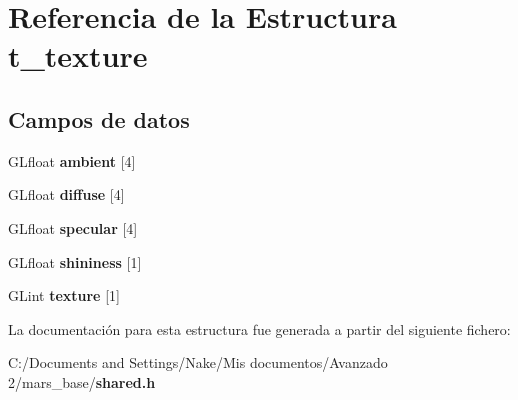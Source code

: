 \section{Referencia de la Estructura t\_\-texture}
\label{structt__texture}
\subsection*{Campos de datos}
\begin{DoxyCompactItemize}
\item 
GLfloat {\bfseries ambient} [4]\label{structt__texture_a06833ed5cacd5df6bbaca06aaae76351}

\item 
GLfloat {\bfseries diffuse} [4]\label{structt__texture_a98b71067a69a63e35816188857acd3be}

\item 
GLfloat {\bfseries specular} [4]\label{structt__texture_a600ea59cda5d0bb3812fc6787287728c}

\item 
GLfloat {\bfseries shininess} [1]\label{structt__texture_a25feb7d3d8b12a0a36a35c0adba9def3}

\item 
GLint {\bfseries texture} [1]\label{structt__texture_a8719ca4dca8e08a172615c978b6f8430}

\end{DoxyCompactItemize}


La documentación para esta estructura fue generada a partir del siguiente fichero:\begin{DoxyCompactItemize}
\item 
C:/Documents and Settings/Nake/Mis documentos/Avanzado 2/mars\_\-base/{\bf shared.h}\end{DoxyCompactItemize}
